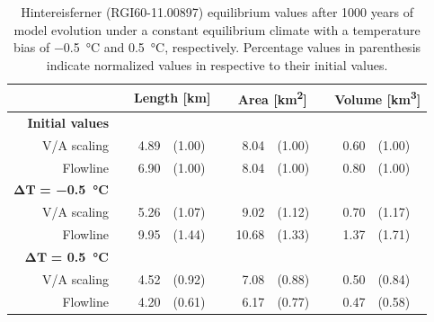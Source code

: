         \begin{table}[htp]
          \centering
          \small
          \caption{Hintereisferner (RGI60-11.00897) equilibrium values after 1000 years of model evolution under a constant equilibrium climate with a temperature bias of \SI{-0.5}{\celsius} and \SI{+0.5}{\celsius}, respectively. Percentage values in parenthesis indicate normalized values in respective to their initial values.}
          \label{tab:hintereisferner_equilibrium_values}
          \begin{tabular}{@{}rcrlcrlcrl@{}}
            \toprule
            {} & \phantom{a} & \multicolumn{2}{c}{\textbf{Length [\si{\kilo\meter}]}} & \phantom{a} & \multicolumn{2}{c}{\textbf{Area [\si{\square\kilo\meter}]}} & \phantom{a} & \multicolumn{2}{c}{\textbf{Volume [\si{\cubic\kilo\meter}]}} \\
            \midrule
            \textbf{Initial values} \\
            V/A scaling & \phantom{a} & 4.89 & (1.00) & \phantom{a} & 8.04 & (1.00) & \phantom{a} & 0.60 & (1.00) \\
            Flowline & \phantom{a} &  6.90 & (1.00) & \phantom{a} & 8.04 & (1.00) & \phantom{a} & 0.80 & (1.00) \\
            $\bm{\Delta T}$\textbf{ = \SI{-0.5}{\celsius}} \\
            V/A scaling & \phantom{a} & 5.26 & (1.07) & \phantom{a} & 9.02 & (1.12) & \phantom{a} & 0.70 & (1.17) \\
            Flowline & \phantom{a} &  9.95 & (1.44) & \phantom{a} & 10.68 & (1.33) & \phantom{a} &  1.37 & (1.71) \\
            \addlinespace
            $\bm{\Delta T}$\textbf{ = \SI{+0.5}{\celsius}} \\
            V/A scaling & \phantom{a} & 4.52 & (0.92) & \phantom{a} & 7.08 & (0.88) & \phantom{a} & 0.50 & (0.84) \\
            Flowline & \phantom{a} &   4.20 & (0.61) & \phantom{a} & 6.17 & (0.77) & \phantom{a} & 0.47 & (0.58) \\
            \bottomrule
          \end{tabular}
        \end{table}
        
